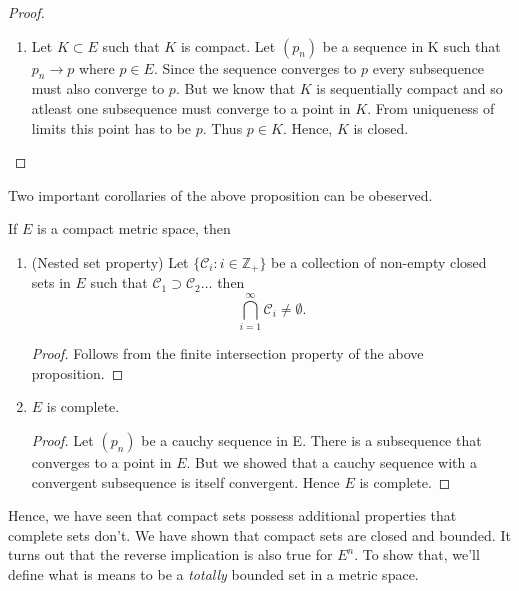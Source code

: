 \begin{proof}
\begin{enumerate}
\begin{itemize}
\begin{proof}
			   $\epsilon > 0$ there is a $N \in \mathbb{Z}_+$ such that $1/N <
			   \epsilon$. Thus for any $n_i \geq N$ we get $d(p_{n_i},p) < 1/n_i <
			   \epsilon$. Hence $p_{n_i} \rightarrow p$.
		       \end{proof}
	       \end{itemize}
	   \item Let $K \subset E$ such that $K$ is compact. Let $\left(p_n\right)$ be a sequence in
	       K such that $p_n \rightarrow p$ where $p \in E$. Since the sequence converges to $p$
	   every subsequence must also converge to $p$. But we know that $K$ is sequentially compact
	   and so atleast one subsequence must converge to a point in $K$. From uniqueness of limits
	   this point has to be $p$. Thus $p \in K$. Hence, $K$ is closed.
   \end{enumerate}
\end{proof}
Two important corollaries of the above proposition can be obeserved.
\begin{Corollary}
    If $E$ is a compact metric space, then
    \begin{enumerate}
	\item (Nested set property) Let $\left.\lbrace\mathcal{C}_i : i \in \mathbb{Z}_+
		\rbrace\right.$ be a collection of
	    non-empty closed sets in $E$ such that $\mathcal{C}_1 \supset \mathcal{C}_2 \dots$
	    then \[\bigcap_{i = 1}^{\infty} \mathcal{C}_i \neq \emptyset .\]
	    \begin{proof}
		Follows from the finite intersection property of the above proposition.
	    \end{proof}
	\item $E$ is complete.
	    \begin{proof}
		Let $\left(p_n\right)$ be a cauchy sequence in E. There is a subsequence that
		converges to a point in $E$. But we showed that a cauchy sequence with a convergent
		subsequence is itself convergent. Hence $E$ is complete.
	    \end{proof}
    \end{enumerate}
\end{Corollary}
Hence, we have seen that compact sets possess additional properties that complete sets don't. We
have shown that compact sets are closed and bounded. It turns out that the reverse implication is
also true for $E^n$. To show that, we'll define what is means to be a \emph{totally} bounded set in
a metric space.

